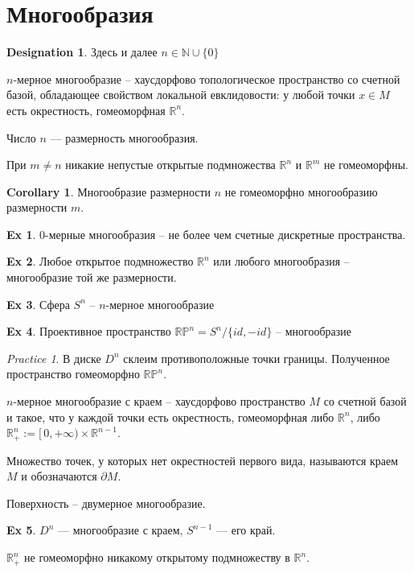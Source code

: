 \documentclass[11pt]{book}
\newcommand{\N}{\mathbb{N}}
\newcommand{\R}{\mathbb{R}}
\newcommand{\Pm}{\mathbb{P}}
\theoremstyle{definition}
\theoremstyle{plain}
\theoremstyle{plain}
\theoremstyle{definition}
\newtheorem*{ex}{Ex}
\newtheorem*{cor}{Corollary}
\newtheorem*{name}{Designation}
\theoremstyle{remark}
\newtheorem*{prac}{Practice}
\begin{document}
\section{Многообразия}
\begin{name}
    Здесь и далее $ n \in \N \cup \{0\}$
\end{name}
\begin{defn}
    $ n$-мерное многообразие -- хаусдорфово топологическое пространство со счетной базой, обладающее свойством локальной евклидовости: у любой точки $ x \in M$ есть окрестность, гомеоморфная  $ \R^{n}$.

    Число $ n$ --- размерность многообразия.
\end{defn}
\begin{thm}
    При $ m \ne n$ никакие непустые открытые подмножества $ \R^{n}$ и $ \R^{m}$ не гомеоморфны.
\end{thm}
\begin{cor}
    Многообразие размерности $ n$ не гомеоморфно многообразию размерности $ m$.
\end{cor}
\begin{ex}
    $ 0$-мерные многообразия -- не более чем счетные дискретные пространства.
\end{ex}
\begin{ex}
    Любое открытое подмножество $ \R^{n}$ или любого многообразия -- многообразие той же размерности.
\end{ex}
\begin{ex}
    Сфера $ S^{n}$ -- $ n$-мерное многообразие
\end{ex}
\begin{ex}
    Проективное пространство $ \R \Pm^{n} = S^{n}/\{id, -id\}$ -- многообразие
\end{ex}
\begin{prac}
    В диске $ D^{n}$ склеим противоположные точки границы. Полученное пространство гомеоморфно $ \R \Pm^{n}$.
\end{prac}
\begin{defn}
    $ n$-мерное многообразие с краем -- хаусдорфово пространство $ M$ со счетной базой и такое, что у каждой точки есть окрестность, гомеоморфная либо  $ \R^{n}$, либо $ \R^{n}_+ := [\,0, +\infty) \times \R^{n-1} $.

    Множество точек, у которых нет окрестностей первого вида, называются {\sf краем} $ M$ и обозначаются $\partial M$.
\end{defn}
\begin{defn}
    Поверхность -- двумерное многообразие.
\end{defn}
\begin{ex}
    $ D^{n}$ --- многообразие с краем, $ S^{n-1}$ --- его край.
\end{ex}
\begin{thm}
    $ \R^{n} _{+}$ не гомеоморфно никакому открытому подмножеству в $ \R^{n} $.
\end{thm}
\end{document}
